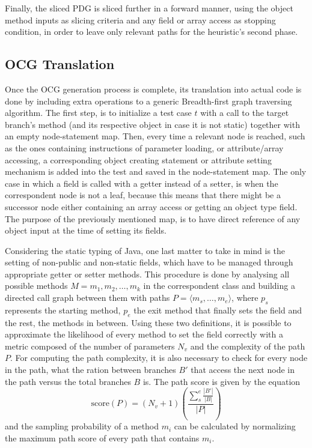 \documentclass[%
  chapterprefix=false,%
  open=right,%
  twoside=true,%
  paper=a4,%
  logofile={Figures/logo.png},%
  thesistype=master,%
  UKenglish,%
]{se2thesis}
\begin{document}
Finally, the sliced PDG is sliced further in a forward manner, using the object method inputs as slicing criteria and any field or array access as stopping condition, in order to leave only relevant paths for the heuristic's second phase.

\subsection{OCG Translation}

Once the OCG generation process is complete, its translation into actual code is done by including extra operations to a generic Breadth-first graph traversing algorithm.
The first step, is to initialize a test case \(t\) with a call to the target branch's method (and its respective object in case it is not static) together with an empty node-statement map.
Then, every time a relevant node is reached, such as the ones containing instructions of parameter loading, or attribute/array accessing, a corresponding object creating statement or attribute setting mechanism is added into the test and saved in the node-statement map.
The only case in which a field is called with a getter instead of a setter, is when the correspondent node is not a leaf, because this means that there might be a successor node either containing an array access or getting an object type field.
The purpose of the previously mentioned map, is to have direct reference of any object input at the time of setting its fields.

Considering the static typing of Java, one last matter to take in mind is the setting of non-public and non-static fields, which have to be managed through appropriate getter or setter methods.
This procedure is done by analysing all possible methods \(M = {m_1, m_2, \dots, m_k} \) in the correspondent class and building a directed call graph between them with paths \(P = \langle m_s, \dots, m_e\rangle\), where \(p_s\) represents the starting method, \(p_e\) the exit method that finally sets the field and the rest, the methods in between.
Using these two definitions, it is possible to approximate the likelihood of every method to set the field correctly with a metric composed of the number of parameters \(N_v\) and the complexity of the path \(P\).
For computing the path complexity, it is also necessary to check for every node in the path, what the ration between branches \(B'\) that access the next node in the path versus the total branches \(B\) is.
The path score is given by the equation
\begin{equation*}
  \text{score}(P) = (N_v + 1)\left(\frac{\sum_{s}^{e} \frac{|B'|}{|B|}}{|P|}\right)
\end{equation*}
and the sampling probability of a method \(m_i\) can be calculated by normalizing the maximum path score of every path that contains \(m_i\).
\end{document}
